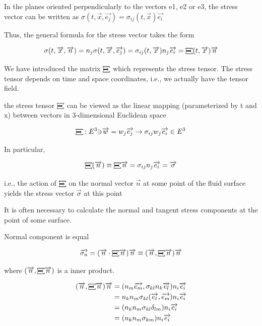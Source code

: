 \documentclass{article}
\begin{document}
{In the planes oriented perpendicularly to the vectors e1, e2 or e3, the stress vector can be
written as $\sigma(t,\overrightarrow{x},\overrightarrow{e_{j}}) = \sigma_{ij}(t,\overrightarrow{x})\overrightarrow{e_{i}}$

Thus, the general formula for the stress vector takes the form 

$$\sigma(t,\overrightarrow{x},\overrightarrow{n}) = n_{j}\sigma(t,\overrightarrow{x},\overrightarrow{e_{j}}) = \sigma_{ij}(t,\overrightarrow{x})n_{j}\overrightarrow{e_{i}} = \rotatebox[origin=c]{90}{\textbf{[I]}}(t,\overrightarrow{x})\overrightarrow{n}$$

We have introduced the matrix $\rotatebox[origin=c]{90}{\textbf{[I]}}$ which represents the stress tensor. The stress tensor depends on time and space coordinates, i.e., we actually have the tensor field.

the stress tensor $\rotatebox[origin=c]{90}{\textbf{[I]}}$ can be viewed as the linear mapping (parameterized by t and x) between vectors in 3-dimensional Euclidean space

$$\rotatebox[origin=c]{90}{\textbf{[I]}}:E^{3} \rotatebox[origin=c]{180}{$\in$} \overrightarrow{w} = w_{j}\overrightarrow{e_{j}}\to \sigma_{ij}w_{j}\overrightarrow{e_{i}}\in E^{3}$$

In particular,

$$\rotatebox[origin=c]{90}{\textbf{[I]}}(\overrightarrow{n})\equiv \rotatebox[origin=c]{90}{\textbf{[I]}}\overrightarrow{n} = \sigma_{ij}n_{j}\overrightarrow{e_{i}} = \overrightarrow{\sigma}$$

i.e., the action of $\rotatebox[origin=c]{90}{\textbf{[I]}}$ on the normal vector $\overrightarrow{n}$ at some point of the fluid surface yields the stress vector $\overrightarrow{\sigma}$ at this point

It is often necessary to calculate the normal and tangent stress components at the point of
some surface.

Normal component is equal

$$\overrightarrow{\sigma_{n}} = (\overrightarrow{n}\cdot\rotatebox[origin=c]{90}{\textbf{[I]}}\overrightarrow{n})\overrightarrow{n} \equiv (\overrightarrow{n},\rotatebox[origin=c]{90}{\textbf{[I]}}\overrightarrow{n})\overrightarrow{n}$$

where $(\overrightarrow{n},\rotatebox[origin=c]{90}{\textbf{[I]}}\overrightarrow{n})$ is a inner product.

\begin{align*}
(\overrightarrow{n},\rotatebox[origin=c]{90}{\textbf{[I]}}\overrightarrow{n})\overrightarrow{n} &= (n_{m}\overrightarrow{e_{m}},\sigma_{kl}n_{k}\overrightarrow{e_{l}})n_{i}\overrightarrow{e_{i}}\\
																								&= n_{k}n_{m}\sigma_{kl}(\overrightarrow{e_{l}},\overrightarrow{e_{m}})n_{i}\overrightarrow{e_{i}}\\
																								&= (n_{k}n_{m}\sigma_{kl}\delta_{lm})n_{i}\overrightarrow{e_{i}}\\
																								&= (n_{k}n_{m}\sigma_{km})n_{i}\overrightarrow{e_{i}}
\end{align*}

}
\end{document}
